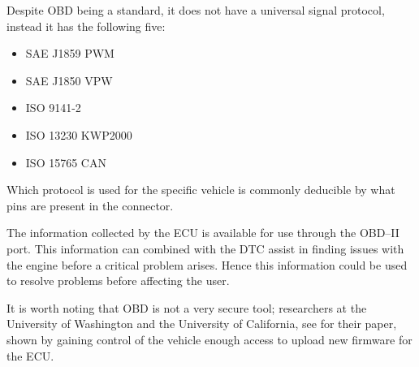 \bigskip
Despite \ac{OBD} being a standard, it does not have a universal signal protocol, instead it has the following five:
\begin{multicols}{2}
\begin{itemize}
    \item SAE J1859 PWM
    \item SAE J1850 VPW
    \item ISO 9141-2
    \item ISO 13230 KWP2000
    \item ISO 15765 CAN
\end{itemize}
\end{multicols}
Which protocol is used for the specific vehicle is commonly deducible by what pins are present in the connector.

The information collected by the \ac{ECU} is available for use through the OBD--II port.
This information can combined with the \ac{DTC} assist in finding issues with the engine before a critical problem arises.
Hence this information could be used to resolve problems before affecting the user.

\medskip
It is worth noting that \ac{OBD} is not a very secure tool; researchers at the University of Washington and the University of California, see \cite{OBDSecurity} for their paper, shown by gaining control of the vehicle enough access to upload new firmware for the \ac{ECU}.
